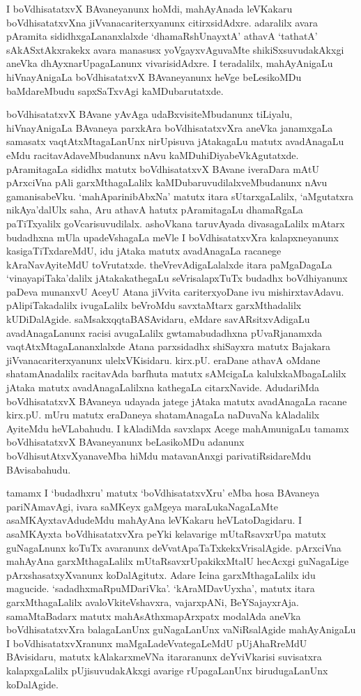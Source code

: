 I boVdhisatatxvX BAvaneyanunx hoMdi, mahAyAnada leVKakaru boVdhisatatxvXna jiVvanacariterxyanunx citirxsidAdxre. adaralilx avara pAramita sididhxgaLananxlalxde `dhamaR\-shUnayxtA' athavA `tathatA' sAkASxtAkxrakekx avara manasusx yoVgayxvAguvaMte shikiSxsu\-vudakAkxgi aneVka dhAyxnarUpagaLanunx vivarisidAdxre. I teradalilx, mahAyAnigaLu hiVnayAnigaLa boVdhisatatxvX BAvaneyanunx heVge beLesikoMDu baMdareMbudu sapxSaTxvAgi kaMDubarutatxde.

boVdhisatatxvX BAvane yAvAga udaBxvisiteMbudanunx tiLiyalu, hiVnayAnigaLa BAvaneya parxkAra boVdhisatatxvXra aneVka janamxgaLa samasatx vaqtAtxMtagaLanUnx nirUpisuva jAtakagaLu matutx avadAnagaLu eMdu racitavAdaveMbudanunx nAvu kaMDuhiDiya\-beVkAgutatxde. pAramitagaLa sididhx matutx boVdhisatatxvX BAvane iveraDara mAtU pArxciVna pAli garxMthagaLalilx kaMDubaruvudilalxveMbudanunx nAvu gamanisabeVku. `mahA\-parinibAbxNa' matutx itara sUtarxgaLalilx, `aMgutatxra nikAya'dalUlx saha, Aru athavA hatutx pAramitagaLu dhamaRgaLa paTiTxyalilx goVcarisuvudilalx. ashoVkana taruvAyada divasagaLalilx mAtarx budadhxna mUla upadeVshagaLa meVle I boVdhisatatxvXra kalapxneyanunx kasigaTiTxdareMdU, idu jAtaka matutx avadAnagaLa racanege kAraNavAyiteMdU toVrutatxde. theVrevAdigaLalalxde itara paMgaDagaLa `vinayapiTaka'dalilx jAtakakathegaLu seVrisalapxTuTx budadhx boVdhiyanunx paDeva munanxvU AceyU Atana jiVvita cariterxyoDane ivu mishirxtavAdavu. pAlipiTakadalilx ivugaLalilx beVroMdu savxtaMtarx garxMthadalilx kUDiDalAgide. saMsakxqqtaBASAvidaru, eMdare savARsitxvAdigaLu avadAnagaLanunx racisi avugaLalilx gwtamabudadhxna pUvaRjanamxda vaqtAtxMtagaLananxlalxde Atana parxsidadhx shiSayxra matutx Bajakara jiVvanacariterxyanunx ulelxVKisidaru. kirx.pU. eraDane athavA oMdane shatamAnadalilx racitavAda barfhuta matutx sAMcigaLa kalulxkaMbagaLalilx jAtaka matutx avadAnagaLalilxna kathegaLa citarxNavide. AdudariMda boVdhisatatxvX BAvaneya udayada jatege jAtaka matutx avadAnagaLa racane kirx.pU. mUru matutx eraDaneya shatamAnagaLa naDuvaNa kAladalilx AyiteMdu heVLabahudu. I kAladiMda savxlapx Acege mahAmunigaLu tamamx boVdhisatatxvX BAvaneyanunx beLasikoMDu adanunx boVdhisutAtxvXyanaveMba hiMdu matavanAnxgi parivatiRsidareMdu BAvisabahudu.

tamamx I `budadhxru' matutx `boVdhisatatxvXru' eMba hosa BAvaneya pariNAma\-vAgi, ivara saMKeyx gaMgeya maraLukaNagaLaMte asaMKAyxtavAdudeMdu mahAyAna leVKakaru heVLatoDagidaru. I asaMKAyxta boVdhisatatxvXra peYki kelavarige mUtaRsavxrUpa matutx guNagaLnunx koTuTx avaranunx deVvatApaTaTxkekxVrisalAgide. pArxciVna mahAyAna garxMthagaLalilx mUtaRsavxrUpakikxMtalU hecAcxgi guNagaLige pArxshasatxyXvanunx koDalAgitutx. Adare Icina garxMthagaLalilx idu magucide. `sadadhxmaRpuMDariVka'. `kAraMDavUyxha', matutx itara garxMthagaLalilx avaloVkiteVshavxra, vajarxpANi, BeYSajayxrAja. samaMtaBadarx matutx mahAsAthxmapArxpatx modalAda aneVka boVdhisatatxvXra balagaLanUnx guNagaLanUnx vaNiRsalAgide mahAyAnigaLu I boVdhisatatxvXranunx maMgaLadeVvategaLeMdU pUjAhaRreMdU BAvisidaru, matutx kAlakarxmeVNa itararanunx deYviVkarisi suvisatxra kalapxgaLalilx pUjisuvudakAkxgi avarige rUpagaLanUnx birudugaLanUnx koDalAgide.

